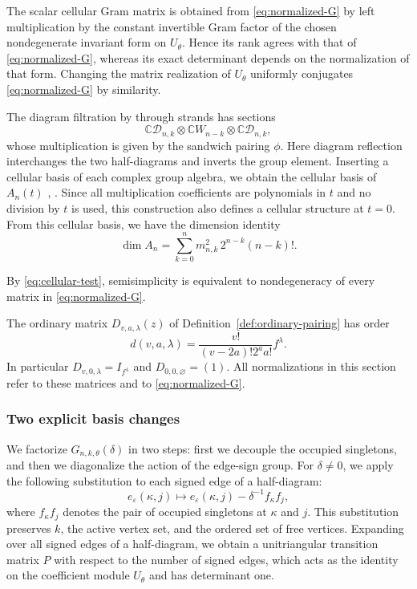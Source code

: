\documentclass[11pt,a4paper]{amsart}
\newcommand{\C}{\mathbb C}\newcommand{\Q}{\mathbb Q}\newcommand{\Z}{\mathbb Z}
\theoremstyle{uprightdefinition}
\theoremstyle{remark}\newtheorem{remark}[theorem]{Remark}
\begin{document}
The scalar cellular Gram matrix is obtained from \eqref{eq:normalized-G} by left multiplication
by the constant invertible Gram factor of the chosen nondegenerate invariant form on $U_\theta$.
Hence its rank agrees with that of \eqref{eq:normalized-G}, whereas its exact
determinant depends on the normalization of that form. Changing the matrix realization of $U_\theta$ uniformly
conjugates \eqref{eq:normalized-G} by similarity.

The diagram filtration by through strands has sections
\[
 \C\mathcal D_{n,k}\otimes\C W_{n-k}\otimes\C\mathcal D_{n,k},
\]
whose multiplication is given by the sandwich pairing $\phi$. Here diagram reflection interchanges
the two half-diagrams and inverts the group element. Inserting a cellular
basis of each complex group algebra, we obtain the cellular basis of $A_n(t)$
\cite[Lemmas~3.3 and~3.5]{Bowman2012},
\cite[Theorem~5.5 and (1.8)]{GL1996}. Since all multiplication coefficients are polynomials
in $t$ and no division by $t$ is used, this construction also defines
a cellular structure at $t=0$. From this cellular basis, we have the dimension identity
\[
 \dim A_n=\sum_{k=0}^n m_{n,k}^{2}\,2^{n-k}(n-k)!.
\]

By \eqref{eq:cellular-test}, semisimplicity is equivalent to
nondegeneracy of every matrix in \eqref{eq:normalized-G}.

The ordinary matrix $D_{v,a,\lambda}(z)$ of
Definition~\ref{def:ordinary-pairing} has order
\[
 d(v,a,\lambda)=\frac{v!}{(v-2a)!2^a a!}f^\lambda.
\]
In particular $D_{v,0,\lambda}=I_{f^\lambda}$ and
$D_{0,0,\varnothing}=(1)$. All normalizations in this section refer to these
matrices and to \eqref{eq:normalized-G}.

\subsubsection{Two explicit basis changes}
We factorize $G_{n,k,\theta}(\delta)$ in two steps: first we decouple the
occupied singletons, and then we diagonalize the action of the
edge-sign group.
For $\delta\ne0$, we apply the following substitution to each signed edge of a half-diagram:
\begin{equation}\label{eq:cut}
 e_\varepsilon(\kappa,j)\longmapsto
 e_\varepsilon(\kappa,j)-\delta^{-1}f_{\kappa}f_j,
\end{equation}
where $f_{\kappa}f_j$ denotes the pair of occupied singletons at $\kappa$ and $j$. This substitution preserves $k$, the active
vertex set, and the ordered set of free vertices. Expanding over all signed edges of a half-diagram, we obtain
a unitriangular transition matrix $P$ with respect to the number of signed edges, which
acts as the identity on the coefficient module $U_\theta$ and has determinant one.
\end{document}

